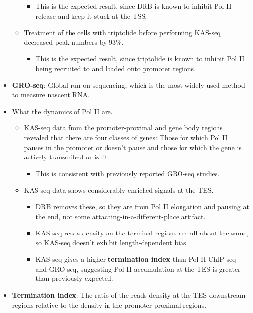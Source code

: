 \documentclass[../notes.tex]{subfiles}
\begin{document}
\begin{itemize}
\begin{itemize}
        \begin{itemize}
            \item This is the expected result, since DRB is known to inhibit Pol II release and keep it stuck at the TSS.
        \end{itemize}
        \item Treatment of the cells with triptolide before performing KAS-seq decreased peak numbers by 93\%.
        \begin{itemize}
            \item This is the expected result, since triptolide is known to inhibit Pol II being recruited to and loaded onto promoter regions.
        \end{itemize}
    \end{itemize}
    \item \textbf{GRO-seq}: Global run-on sequencing, which is the most widely used method to measure nascent RNA.
    \item What the dynamics of Pol II are.
    \begin{itemize}
        \item KAS-seq data from the promoter-proximal and gene body regions revealed that there are four classes of genes: Those for which Pol II pauses in the promoter or doesn't pause and those for which the gene is actively transcribed or isn't.
        \begin{itemize}
            \item This is consistent with previously reported GRO-seq studies.
        \end{itemize}
        \item KAS-seq data shows considerably enriched signals at the TES.
        \begin{itemize}
            \item DRB removes these, so they are from Pol II elongation and pausing at the end, not some attaching-in-a-different-place artifact.
            \item KAS-seq reads density on the terminal regions are all about the same, so KAS-seq doesn't exhibit length-dependent bias.
            \item KAS-seq gives a higher \textbf{termination index} than Pol II ChIP-seq and GRO-seq, suggesting Pol II accumulation at the TES is greater than previously expected.
        \end{itemize}
    \end{itemize}
    \item \textbf{Termination index}: The ratio of the reads density at the TES downstream regions relative to the density in the promoter-proximal regions.

\end{itemize}
\end{document}
